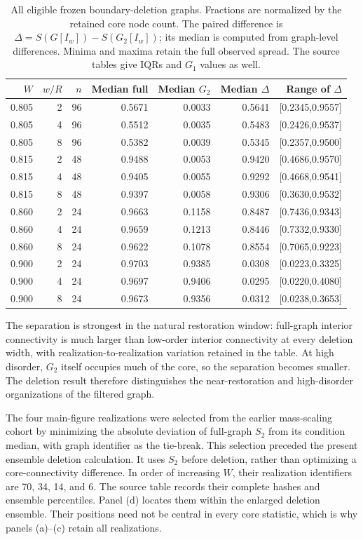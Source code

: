 \documentclass[11pt]{article}
\begin{document}
\begin{table}[htbp]
\centering\small
\caption{All eligible frozen boundary-deletion graphs. Fractions are normalized by the retained core node count. The paired difference is $\Delta=S(G[I_w])-S(G_2[I_w])$; its median is computed from graph-level differences. Minima and maxima retain the full observed spread. The source tables give IQRs and $G_1$ values as well.}\label{tab:deletion}
\begin{tabular}{rrrrrrr}
\toprule
$W$ & $w/R$ & $n$ & Median full & Median $G_2$ & Median $\Delta$ & Range of $\Delta$ \\
\midrule
0.805 & 2 & 96 & 0.5671 & 0.0033 & 0.5641 & [0.2345,0.9557] \\
0.805 & 4 & 96 & 0.5512 & 0.0035 & 0.5483 & [0.2426,0.9537] \\
0.805 & 8 & 96 & 0.5382 & 0.0039 & 0.5345 & [0.2357,0.9500] \\
0.815 & 2 & 48 & 0.9488 & 0.0053 & 0.9420 & [0.4686,0.9570] \\
0.815 & 4 & 48 & 0.9405 & 0.0055 & 0.9292 & [0.4668,0.9541] \\
0.815 & 8 & 48 & 0.9397 & 0.0058 & 0.9306 & [0.3630,0.9532] \\
0.860 & 2 & 24 & 0.9663 & 0.1158 & 0.8487 & [0.7436,0.9343] \\
0.860 & 4 & 24 & 0.9659 & 0.1213 & 0.8446 & [0.7332,0.9330] \\
0.860 & 8 & 24 & 0.9622 & 0.1078 & 0.8554 & [0.7065,0.9223] \\
0.900 & 2 & 24 & 0.9703 & 0.9385 & 0.0308 & [0.0223,0.3325] \\
0.900 & 4 & 24 & 0.9697 & 0.9406 & 0.0295 & [0.0220,0.4080] \\
0.900 & 8 & 24 & 0.9673 & 0.9356 & 0.0312 & [0.0238,0.3653] \\
\bottomrule
\end{tabular}
\end{table}

The separation is strongest in the natural restoration window: full-graph interior connectivity is much larger than low-order interior connectivity at every deletion width, with realization-to-realization variation retained in the table. At high disorder, $G_2$ itself occupies much of the core, so the separation becomes smaller. The deletion result therefore distinguishes the near-restoration and high-disorder organizations of the filtered graph.

The four main-figure realizations were selected from the earlier mass-scaling cohort by minimizing the absolute deviation of full-graph $S_2$ from its condition median, with graph identifier as the tie-break. This selection preceded the present ensemble deletion calculation. It uses $S_2$ before deletion, rather than optimizing a core-connectivity difference. In order of increasing $W$, their realization identifiers are 70, 34, 14, and 6. The source table records their complete hashes and ensemble percentiles. Panel (d) locates them within the enlarged deletion ensemble. Their positions need not be central in every core statistic, which is why panels (a)--(c) retain all realizations.
\end{document}
